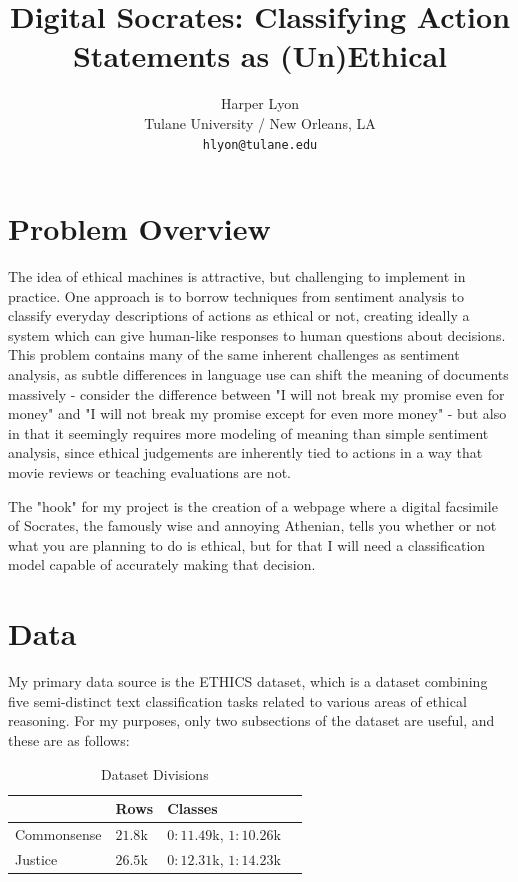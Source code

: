 \documentclass[11pt,a4paper]{article}
\title{Digital Socrates: Classifying Action Statements as (Un)Ethical}
\author{Harper Lyon \\
  Tulane University / New Orleans, LA \\
  \texttt{hlyon@tulane.edu}}
\date{}
\begin{document}
\maketitle

\section{Problem Overview}

The idea of ethical machines is attractive, but challenging to implement in practice. One approach is to borrow techniques from sentiment analysis \cite{hendrycks2023aligning} to classify everyday descriptions of actions as ethical or not, creating ideally a system which can give human-like responses to human questions about decisions. This problem contains many of the same inherent challenges as sentiment analysis, as subtle differences in language use can shift the meaning of documents massively - consider the difference between "I will not break my promise even for money" and "I will not break my promise except for even more money" - but also in that it seemingly requires more modeling of meaning than simple sentiment analysis, since ethical judgements are inherently tied to actions in a way that movie reviews or teaching evaluations are not. 

The "hook" for my project is the creation of a webpage where a digital facsimile of Socrates, the famously wise and annoying Athenian, tells you whether or not what you are planning to do is ethical, but for that I will need a classification model capable of accurately making that decision.

\section{Data}

My primary data source is the ETHICS \cite{hendrycks2023aligning} dataset, which is a dataset combining five semi-distinct text classification tasks related to various areas of ethical reasoning. For my purposes, only two subsections of the dataset are useful, and these are as follows:

\begin{table}[htbp]
    \centering
    \caption{Dataset Divisions}
    \begin{tabular}{llll}
        \toprule
        & \textbf{Rows} & \textbf{Classes}\\
        \midrule
        Commonsense & $21.8$k & $0:11.49$k, $1:10.26$k\\
        Justice & $26.5$k & $0:12.31$k, $1:14.23$k\\
        \bottomrule
    \end{tabular}
    \label{tab:my_table}
\end{table}
\end{document}
